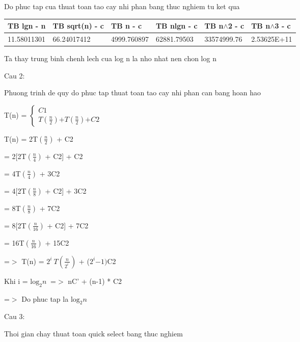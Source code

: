 \documentclass{article}
\begin{document}
Do phuc tap cua thuat toan tao cay nhi phan bang thuc nghiem tu ket qua 

\begin{tabular}{|p{0.7in}|p{0.7in}|p{0.7in}|p{0.7in}|p{0.7in}|p{0.7in}|} \hline 
TB lgn - n & TB sqrt(n) - c & TB n - c & TB nlgn - c & TB n$\mathrm{\wedge}$2 - c & TB  n$\mathrm{\wedge}$3 - c \\ \hline 
11.58011301 & 66.24017412 & 4999.760897 & 62881.79503 & 33574999.76 & 2.53625E+11 \\ \hline 
\end{tabular}

Ta thay trung binh chenh lech cua log n la nho nhat nen chon log n

\noindent 

\noindent 

\noindent Cau 2:  

\noindent Phuong trinh de quy do phuc tap thuat toan tao cay nhi phan can bang hoan hao

\noindent T(n) = $\left\{ \begin{array}{c}
C\mathrm{1} \\ 
T\left(\frac{n}{\mathrm{2}}\right)\mathrm{+}T\left(\frac{n}{\mathrm{2}}\right)\mathrm{+}C\mathrm{2} \end{array}
\right.$

\noindent 

\noindent T(n) = 2T$\left(\frac{n}{\mathrm{2}}\right)$ + C2

 = 2[2T$\left(\frac{n}{\mathrm{4}}\right)$ + C2] + C2

 = 4T$\left(\frac{n}{\mathrm{4}}\right)$ + 3C2

 = 4[2T$\left(\frac{n}{\mathrm{8}}\right)$ + C2] + 3C2

 = 8T$\left(\frac{n}{\mathrm{8}}\right)$ + 7C2

 = 8[2T$\left(\frac{n}{\mathrm{16}}\right)$ + C2] + 7C2

 = 16T$\left(\frac{n}{\mathrm{16}}\right)$ + 15C2

\noindent =$\mathrm{>}$ T(n) = ${\mathrm{2}}^i\mathrm{\ }T\left(\frac{n}{{\mathrm{2}}^i\mathrm{\ }}\right)$ + (${\mathrm{2}}^i\mathrm{-}\mathrm{1)}$C2

\noindent Khi i = ${{\mathrm{log}}_{\mathrm{2}} n\ }$ =$\mathrm{>}$ nC' + (n-1) * C2

\noindent =$\mathrm{>}$ Do phuc tap la ${{\mathrm{log}}_{\mathrm{2}} n\ }$

\noindent Cau 3: 

\noindent Thoi gian chay thuat toan quick select bang thuc nghiem
\end{document}
